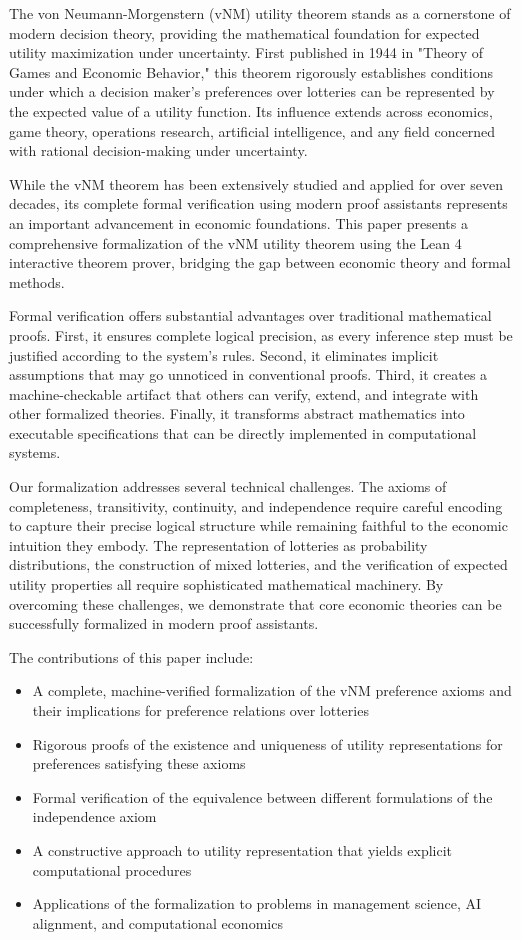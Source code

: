\documentclass{article}
\theoremstyle{definition}
\begin{document}
The von Neumann-Morgenstern (vNM) utility theorem stands as a cornerstone of modern decision theory, providing the mathematical foundation for expected utility maximization under uncertainty. First published in 1944 in "Theory of Games and Economic Behavior,"\cite{vNM1944} this theorem rigorously establishes conditions under which a decision maker's preferences over lotteries can be represented by the expected value of a utility function. Its influence extends across economics, game theory, operations research, artificial intelligence, and any field concerned with rational decision-making under uncertainty.

While the vNM theorem has been extensively studied and applied for over seven decades, its complete formal verification using modern proof assistants represents an important advancement in economic foundations. This paper presents a comprehensive formalization of the vNM utility theorem using the Lean 4 interactive theorem prover, bridging the gap between economic theory and formal methods.

Formal verification offers substantial advantages over traditional mathematical proofs. First, it ensures complete logical precision, as every inference step must be justified according to the system's rules. Second, it eliminates implicit assumptions that may go unnoticed in conventional proofs. Third, it creates a machine-checkable artifact that others can verify, extend, and integrate with other formalized theories. Finally, it transforms abstract mathematics into executable specifications that can be directly implemented in computational systems.

Our formalization addresses several technical challenges. The axioms of completeness, transitivity, continuity, and independence require careful encoding to capture their precise logical structure while remaining faithful to the economic intuition they embody. The representation of lotteries as probability distributions, the construction of mixed lotteries, and the verification of expected utility properties all require sophisticated mathematical machinery. By overcoming these challenges, we demonstrate that core economic theories can be successfully formalized in modern proof assistants.

The contributions of this paper include:

\begin{itemize}
    \item A complete, machine-verified formalization of the vNM preference axioms and their implications for preference relations over lotteries
    \item Rigorous proofs of the existence and uniqueness of utility representations for preferences satisfying these axioms
    \item Formal verification of the equivalence between different formulations of the independence axiom
    \item A constructive approach to utility representation that yields explicit computational procedures
    \item Applications of the formalization to problems in management science, AI alignment, and computational economics
\end{itemize}
\end{document}
